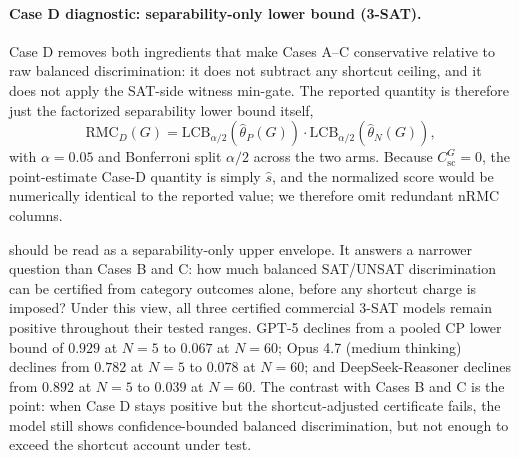 \documentclass[conference]{IEEEtran}
\theoremstyle{remark}
\newcommand{\LCB}{\mathrm{LCB}}
\newcommand{\RMC}{\mathrm{RMC}}
\newcommand{\shortcutCeiling}{C_{\mathrm{sc}}^{G}}
\begin{document}
\paragraph{Case D diagnostic: separability-only lower bound (3-SAT).}
Case D removes both ingredients that make Cases A--C conservative relative to raw balanced discrimination: it does not subtract any shortcut ceiling, and it does not apply the SAT-side witness min-gate.  The reported quantity is therefore just the factorized separability lower bound itself,
\[
\RMC_D(G)=\LCB_{\alpha/2}(\hat\theta_P(G))\cdot\LCB_{\alpha/2}(\hat\theta_N(G)),
\]
with $\alpha=0.05$ and Bonferroni split $\alpha/2$ across the two arms.
Because $\shortcutCeiling=0$, the point-estimate Case-D quantity is simply $\hat s$, and the normalized score would be numerically identical to the reported value; we therefore omit redundant $\mathrm{nRMC}$ columns.

 should be read as a separability-only upper envelope.  It answers a narrower question than Cases B and C: how much balanced SAT/UNSAT discrimination can be certified from category outcomes alone, before any shortcut charge is imposed?  Under this view, all three certified commercial 3-SAT models remain positive throughout their tested ranges.  GPT-5 declines from a pooled CP lower bound of $0.929$ at $N=5$ to $0.067$ at $N=60$; Opus 4.7 (medium thinking) declines from $0.782$ at $N=5$ to $0.078$ at $N=60$; and DeepSeek-Reasoner declines from $0.892$ at $N=5$ to $0.039$ at $N=60$.  The contrast with Cases B and C is the point: when Case D stays positive but the shortcut-adjusted certificate fails, the model still shows confidence-bounded balanced discrimination, but not enough to exceed the shortcut account under test.
\end{document}
